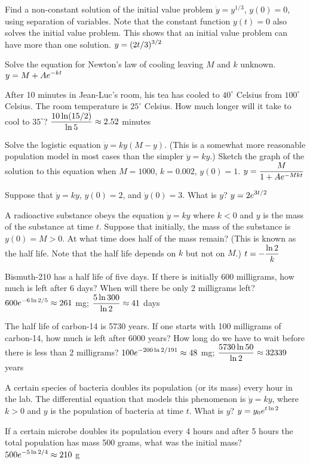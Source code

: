 \exercise Find a non-constant solution of the initial value problem 
$\dot{y} = y^{1/3}$, $y(0)=0$, using
 separation of variables. Note that the constant function $y(t)=0 $
 also solves the initial value problem. This shows that an initial value
 problem can have more than one solution.
\answer $\displaystyle y=(2t/3)^{3/2}$
\endanswer
\endexercise

\exercise Solve the equation for Newton's law of cooling leaving $M$
and $k$ unknown.
\answer $\displaystyle y=M+Ae^{-kt}$
\endanswer
\endexercise

\exercise After 10 minutes in Jean-Luc's room, his tea has
cooled to $40^\circ $ Celsius from $100^\circ$ Celsius. 
The room temperature is $25^\circ$
Celsius. How much longer will it take to cool to $35^\circ$?
\answer $\displaystyle {10\ln(15/2)\over\ln 5}\approx 2.52$ minutes
\endanswer 
\endexercise

\exercise Solve 
the {\dfont logistic equation\/} $\dot{y} = ky(M-y)$. (This is a somewhat more
reasonable population model in most cases than the simpler
$\dot y=ky$.) Sketch the
graph of the solution to this equation when 
$M=1000$, $k=0.002$, $y(0)=1$.
\answer $\displaystyle y={M\over 1+Ae^{-Mkt}}$
\endanswer
\endexercise

\exercise Suppose that $\dot{y} = ky$, $y(0)=2$, and $\dot{y}(0)=3$. 
What is $y$?
\answer $\displaystyle y=2e^{3t/2}$
\endanswer
\endexercise

\exercise A radioactive substance obeys the equation
$\dot{y} =ky$ where $k< 0 $ and $y$ is the mass of the
substance at time $t$. Suppose that initially, the mass of the
substance is $y(0)=M>0$. At what time does half of the mass remain?
(This is known as the half life. Note that the half life depends on
$k$ but not on $M$.)
\answer $\displaystyle t=-{\ln 2\over k}$
\endanswer
\endexercise

\exercise Bismuth-210 has a half life of five days. If there is
initially 600 milligrams, how much is left after 6 days? When will
there be only 2 milligrams left?
\answer $\displaystyle 600e^{-6\ln 2/5}\approx 261$ mg; $\displaystyle {5\ln
  300\over\ln2}\approx 41$ days
\endanswer
\endexercise

\exercise The half life of carbon-14 is 5730 years. If one starts
with 100 milligrams of carbon-14, how much is left after 6000
years? How long do we have to wait before there is less than 2
milligrams?
\answer $\displaystyle 100e^{-200\ln 2/191}\approx 48$ mg; $\displaystyle {5730\ln
  50\over\ln2}\approx 32339$ years
\endanswer
\endexercise

\exercise A certain species of bacteria doubles its population
(or its mass)
every hour in the lab. 
The differential equation that models this phenomenon
is $\dot{y} =ky$, where $k>0 $ and $y$
is the population of bacteria at time $t$. What is $y$?
\answer $\displaystyle y=y_0e^{t\ln 2}$
\endanswer
\endexercise

\exercise If a certain microbe doubles its population every 4
hours and after 5 hours the total population has mass 500 grams,
what was the initial mass?
\answer $\displaystyle 500e^{-5\ln2/4}\approx 210$ g
\endanswer
\endexercise

\endexercises
